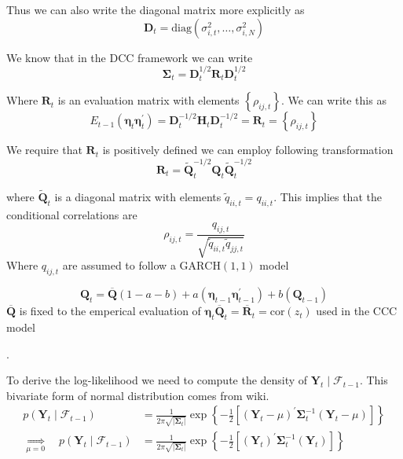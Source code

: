 \documentclass{article}
\begin{document}
Thus we can also write the diagonal matrix more explicitly as
\[
\mathbf{D}_{t}=\text{diag}\left(\sigma_{i,t}^{2},\dots,\sigma_{i,N}^{2}\right)
\]

We know that in the DCC framework we can write
\[
\boldsymbol{\Sigma}_{t}=\mathbf{D}_{t}^{1/2}\mathbf{R}_{t}\mathbf{D}_{t}^{1/2}
\]

Where $\mathbf{R}_{t}$ is an evaluation matrix with elements $\left\{ \rho_{ij,t}\right\} $.
We can write this as
\[
E_{t-1}\left(\boldsymbol{\eta}_{t}\boldsymbol{\eta}_{t}^{\prime}\right)=\mathbf{D}_{t}^{-1/2}\mathbf{H}_{t}\mathbf{D}_{t}^{-1/2}=\mathbf{R}_{t}=\left\{ \rho_{ij,t}\right\} 
\]

We require that $\mathbf{R}_{t}$ is positively defined we can employ
following transformation
\[
\mathbf{R}_{t}=\widetilde{\mathbf{Q}}_{t}^{-1/2}\mathbf{Q}_{t}\widetilde{\mathbf{Q}}_{t}^{-1/2}
\]

where $\widetilde{\mathbf{Q}}_{t}$ is a diagonal matrix with elements
$\tilde{q}_{ii,t}=q_{ii,t}$. This implies that the conditional correlations
are
\[
\rho_{ij,t}=\frac{q_{ij,t}}{\sqrt{\widetilde{q}_{ii,t}\widetilde{q}_{jj,t}}}
\]
 Where $q_{ij,t}$ are assumed to follow a $\text{GARCH}(1,1)$ model

\[
\boldsymbol{Q}_{t}=\overline{\boldsymbol{Q}}(1-a-b)+a\left(\boldsymbol{\eta}_{t-1}\boldsymbol{\eta}_{t-1}^{\prime}\right)+b\left(\boldsymbol{Q}_{t-1}\right)
\]
$\overline{\boldsymbol{Q}}$ is fixed to the emperical evaluation
of $\boldsymbol{\eta}_{t}\overline{\boldsymbol{Q}}_{t}=\overline{\boldsymbol{R}}_{t}=\text{cor}\left(z_{t}\right)$
used in the CCC model

.

To derive the log-likelihood we need to compute the density of $\mathbf{Y}_{t}\mid\mathcal{F}_{t-1}$.
This bivariate form of normal distribution comes from wiki. 
\begin{align*}
p\left(\mathbf{Y}_{t}\mid\mathcal{F}_{t-1}\right) & =\frac{1}{2\pi\sqrt{|\boldsymbol{\Sigma}_{t}|}}\exp\left\{ -\frac{1}{2}\left[\left(\mathbf{Y}_{t}-\mu\right)^{\prime}\boldsymbol{\Sigma}_{t}^{-1}\left(\mathbf{Y}_{t}-\mu\right)\right]\right\} \\
\underset{\mu=0}{\Longrightarrow}\quad p\left(\mathbf{Y}_{t}\mid\mathcal{F}_{t-1}\right) & =\frac{1}{2\pi\sqrt{|\boldsymbol{\Sigma}_{t}|}}\exp\left\{ -\frac{1}{2}\left[\left(\mathbf{Y}_{t}\right)^{\prime}\boldsymbol{\Sigma}_{t}^{-1}\left(\mathbf{Y}_{t}\right)\right]\right\} 
\end{align*}
\end{document}
